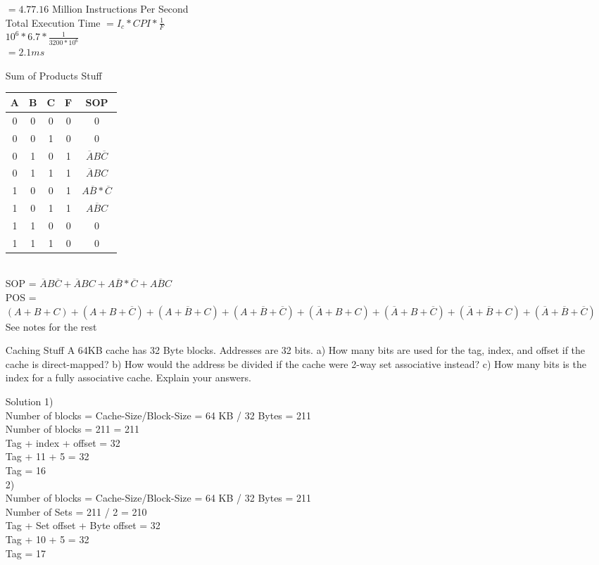 \documentclass[12pt,largemargins]{article}
\begin{document}
\begin{itemize}
$=4.77.16$ Million Instructions Per Second\\
Total Execution Time $=I_c  *CPI * \frac{1}{F}$\\
$10^6 * 6.7 * \frac{1}{3200*10^6}$\\
$=2.1ms$\\
\item[Sum of Products Stuff]
\begin{tabular}{|c|c|c|c|c|}
\hline
A&B&C&F&SOP\\
\hline
0&0&0&0&0\\
0&0&1&0&0\\
0&1&0&1&$\overline{A}B\overline{C}$\\
0&1&1&1&$\overline{A}BC$\\
1&0&0&1&$A\overline{B}* \overline{C}$\\
1&0&1&1&$A\overline{B}C$\\
1&1&0&0&0\\
1&1&1&0&0\\
\hline
\end{tabular}\\
SOP = $\overline{A}B\overline{C} + \overline{A}BC + A\overline{B}*\overline{C} + A\overline{B}C$\\
POS = $(A+B+C)+(A+B+\overline{C}) + (A+\overline{B}+C)+(A+\overline{B}+\overline{C}) + (\overline{A}+B+C)+(\overline{A}+B+\overline{C})+(\overline{A}+\overline{B}+C)+(\overline{A} + \overline{B}+\overline{C})$
See notes for the rest\\
\item[Caching Stuff]
A 64KB cache has 32 Byte blocks. Addresses are 32 bits. a) How many bits are used for the tag, index, and offset if the cache is direct-mapped? b) How would the address be divided if the cache were 2-way set associative instead? c) How many bits is the index for a fully associative cache. Explain your answers. \\
\item[Solution]
1)\\
Number of blocks = Cache-Size/Block-Size = 64 KB / 32 Bytes = 211\\
Number of blocks = 211  = 211\\
Tag + index + offset = 32\\
Tag + 11 + 5 = 32\\
Tag = 16\\

2)\\
Number of blocks = Cache-Size/Block-Size = 64 KB / 32 Bytes = 211\\
Number of Sets = 211 / 2 = 210\\
Tag + Set offset + Byte offset = 32\\
Tag + 10 + 5 = 32\\
Tag = 17\\


\end{itemize}
\end{document}
